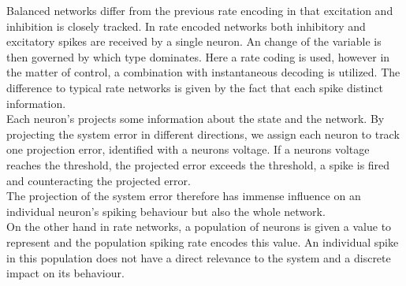 Balanced networks differ from the previous rate encoding in that excitation and inhibition is closely tracked. In rate encoded networks both inhibitory and excitatory spikes are received by a single neuron. An change of the variable is then governed by which type dominates. Here a rate coding is used, however in the matter of control, a combination with instantaneous decoding is \cite{johnson_minimum-error_2016} utilized. The difference to typical rate networks is given by the fact that each spike distinct information.\\
Each neuron's projects some information about the state and the network. By projecting the system error in different directions, we assign each neuron to track one projection error, identified with a neurons voltage. If a neurons voltage reaches the threshold, the projected error exceeds the threshold, a spike is fired and counteracting the projected error.\\
The projection of the system error therefore has immense influence on an individual neuron's spiking behaviour but also the whole network.\\
On the other hand in rate networks, a population of neurons is given a value to represent and the population spiking rate encodes this value. An individual spike in this population does not have a direct relevance to the system and a discrete impact on its behaviour.\\
